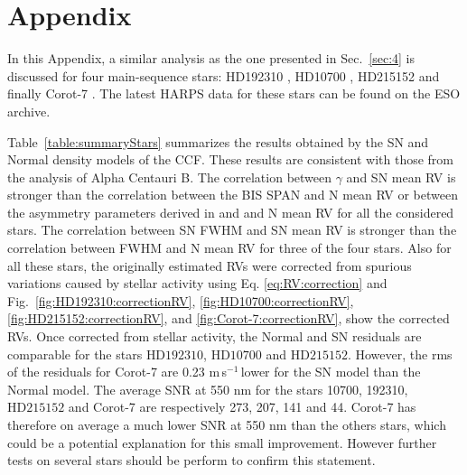 \documentclass{aa}
\def\ms{\hbox{\,m\,s$^{-1}$}}         %
\newcommand{\xavier}[1]{{\color{blue}[[\textbf{Xavier: }#1]]}}
\begin{document}
\appendix
\section{Appendix} \label{appendix}

In this Appendix, a similar analysis as the one presented in Sec.~\ref{sec:4} is discussed for four main-sequence stars: HD192310 \citep[K2V,][]{Pepe-2011}, HD10700 \citep[G8V,][]{Feng:2017ac}, HD215152 \citep[K3V,][]{Delisle:2018aa} and finally Corot-7 \citep[K0V,][]{Haywood-2014}. The latest HARPS data for these stars can be found on the ESO archive.

Table~\ref{table:summaryStars} summarizes the results obtained by the SN and Normal density models of the CCF. 
These results are consistent with those from the analysis of Alpha Centauri B. 
The correlation between $\gamma$ and SN mean RV is stronger than the correlation between the BIS SPAN and N mean RV or between the asymmetry parameters derived in \citet{Boisse-2009} and \citet{Figueira-2013} and N mean RV for all the considered stars. 
The correlation between SN FWHM and SN mean RV is stronger than the correlation between FWHM and N mean RV for three of the four stars.  
Also for all these stars, the originally estimated RVs were corrected from spurious variations caused by stellar activity using Eq. \ref{eq:RV:correction} and Fig.~\ref{fig:HD192310:correctionRV}, \ref{fig:HD10700:correctionRV}, \ref{fig:HD215152:correctionRV}, and \ref{fig:Corot-7:correctionRV}, show the corrected RVs. 
Once corrected from stellar activity, the Normal and SN residuals are comparable for the stars $\text{HD}192310$, $\text{HD}10700$ and $\text{HD}215152$.
However, the rms of the residuals for Corot-7 are 0.23\,\ms\,lower for the SN model than the Normal model.  %
The average SNR at 550 nm for the stars 10700, 192310, $\text{HD}215152$ and Corot-7 are respectively 273, 207, 141 and 44.
Corot-7 has therefore on average a much lower SNR at 550 nm than the others stars, which could be a potential explanation for this small improvement. However further tests on several stars should be perform to confirm this statement. 
\end{document}
